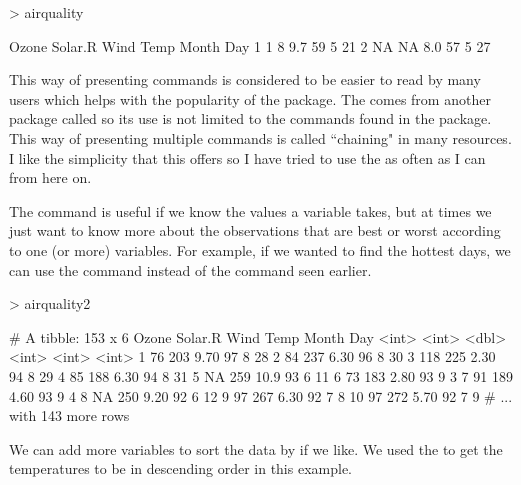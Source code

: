 \begin{Schunk}
\begin{Sinput}
> airquality %>% filter(Wind<10&Temp<60) 
\end{Sinput}
\begin{Soutput}
  Ozone Solar.R Wind Temp Month Day
1     1       8  9.7   59     5  21
2    NA      NA  8.0   57     5  27
\end{Soutput}
\end{Schunk}

This way of presenting commands is considered to be easier to read by many users which helps with the popularity of the   package. The  comes from another package called  so its use is not limited to the commands found in the  package.  
This way of presenting multiple commands is called ``chaining" in many resources. I like the simplicity that this offers so I have tried to use the  as often as I can from here on. 
  
The  command is useful if we know the values a variable takes, but at times we just want to know more about the observations that are best or worst according to one (or more) variables. For example, if we wanted to find the hottest days, we can use the  command instead of the  command seen earlier. 

\begin{Schunk}
\begin{Sinput}
> airquality2 %>% arrange(desc(Temp)) 
\end{Sinput}
\begin{Soutput}
# A tibble: 153 x 6
   Ozone Solar.R  Wind  Temp Month   Day
   <int>   <int> <dbl> <int> <int> <int>
 1    76     203  9.70    97     8    28
 2    84     237  6.30    96     8    30
 3   118     225  2.30    94     8    29
 4    85     188  6.30    94     8    31
 5    NA     259 10.9     93     6    11
 6    73     183  2.80    93     9     3
 7    91     189  4.60    93     9     4
 8    NA     250  9.20    92     6    12
 9    97     267  6.30    92     7     8
10    97     272  5.70    92     7     9
# ... with 143 more rows
\end{Soutput}
\end{Schunk}

We can add more variables to sort the data by if we like. We used the  to get the temperatures to be in descending order in this example. 
 
